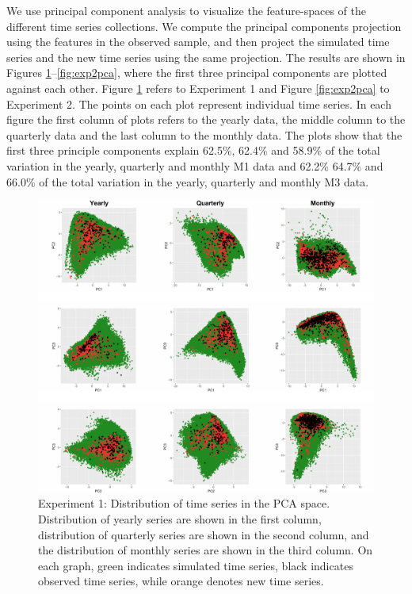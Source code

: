 \documentclass[11pt,a4paper,]{article}
\theoremstyle{definition}
\theoremstyle{definition}
\theoremstyle{definition}
\theoremstyle{remark}
\begin{document}
We use principal component analysis to visualize the feature-spaces of
the different time series collections. We compute the principal
components projection using the features in the observed sample, and
then project the simulated time series and the new time series using the
same projection. The results are shown in Figures
\ref{fig:exp1pca}--\ref{fig:exp2pca}, where the first three principal
components are plotted against each other. Figure \ref{fig:exp1pca}
refers to Experiment 1 and Figure \ref{fig:exp2pca} to Experiment 2. The
points on each plot represent individual time series. In each figure the
first column of plots refers to the yearly data, the middle column to
the quarterly data and the last column to the monthly data. The plots
show that the first three principle components explain 62.5\%, 62.4\%
and 58.9\% of the total variation in the yearly, quarterly and monthly
M1 data and 62.2\% 64.7\% and 66.0\% of the total variation in the
yearly, quarterly and monthly M3 data.

\begin{figure}

{\centering \includegraphics[width=\textwidth]{figure/exp1pca-1} 

}

\caption{Experiment 1: Distribution of time series in the PCA space. Distribution of yearly series are shown in the first column, distribution of quarterly series are shown in the second column, and the distribution of monthly series are shown in the third column. On each graph, green indicates simulated time series, black indicates observed time series, while orange denotes new time series.}\label{fig:exp1pca}
\end{figure}
\end{document}
